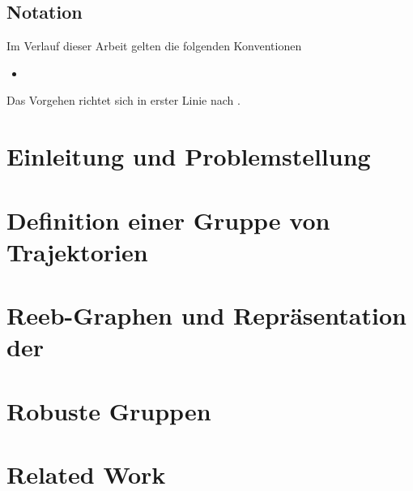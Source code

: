 




\tableofcontents

\section*{Notation}
Im Verlauf dieser Arbeit gelten die folgenden Konventionen
\begin{itemize}
	\item 
\end{itemize}
Das Vorgehen richtet sich in erster Linie nach \textcite{buchin2015}.
\cleardoubleoddemptypage
{}
\setcounter{page}{1}
\setcounter{footnote}{0}

\chapter{Einleitung und Problemstellung} %
\label{cha:einleitung}


\chapter{Definition einer Gruppe von Trajektorien} %
\label{cha:def_gruppe}


\chapter{Reeb-Graphen und Repräsentation der \GrpStruktur} %
\label{cha:reeb_graphen}


\chapter{Robuste Gruppen} %
\label{cha:robust}


\chapter{Related Work} %
\label{cha:related_work}







\cleardoubleoddemptypage
{}
\setcounter{page}{1}
\appendix
\printindex
\listoffigures
\printbibliography
\todototoc
{}
